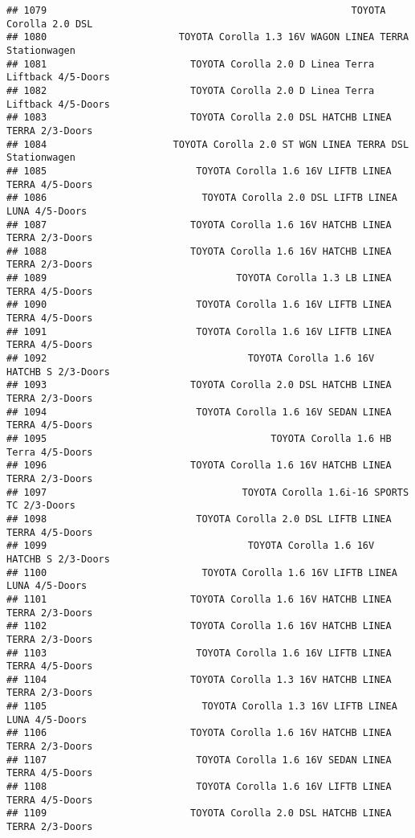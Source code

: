 \documentclass[]{article}
\begin{document}
\begin{verbatim}
## 1079                                                     TOYOTA Corolla 2.0 DSL 
## 1080                       TOYOTA Corolla 1.3 16V WAGON LINEA TERRA Stationwagen
## 1081                         TOYOTA Corolla 2.0 D Linea Terra Liftback 4/5-Doors
## 1082                         TOYOTA Corolla 2.0 D Linea Terra Liftback 4/5-Doors
## 1083                         TOYOTA Corolla 2.0 DSL HATCHB LINEA TERRA 2/3-Doors
## 1084                      TOYOTA Corolla 2.0 ST WGN LINEA TERRA DSL Stationwagen
## 1085                          TOYOTA Corolla 1.6 16V LIFTB LINEA TERRA 4/5-Doors
## 1086                           TOYOTA Corolla 2.0 DSL LIFTB LINEA LUNA 4/5-Doors
## 1087                         TOYOTA Corolla 1.6 16V HATCHB LINEA TERRA 2/3-Doors
## 1088                         TOYOTA Corolla 1.6 16V HATCHB LINEA TERRA 2/3-Doors
## 1089                                 TOYOTA Corolla 1.3 LB LINEA TERRA 4/5-Doors
## 1090                          TOYOTA Corolla 1.6 16V LIFTB LINEA TERRA 4/5-Doors
## 1091                          TOYOTA Corolla 1.6 16V LIFTB LINEA TERRA 4/5-Doors
## 1092                                   TOYOTA Corolla 1.6 16V HATCHB S 2/3-Doors
## 1093                         TOYOTA Corolla 2.0 DSL HATCHB LINEA TERRA 2/3-Doors
## 1094                          TOYOTA Corolla 1.6 16V SEDAN LINEA TERRA 4/5-Doors
## 1095                                       TOYOTA Corolla 1.6 HB Terra 4/5-Doors
## 1096                         TOYOTA Corolla 1.6 16V HATCHB LINEA TERRA 2/3-Doors
## 1097                                  TOYOTA Corolla 1.6i-16 SPORTS TC 2/3-Doors
## 1098                          TOYOTA Corolla 2.0 DSL LIFTB LINEA TERRA 4/5-Doors
## 1099                                   TOYOTA Corolla 1.6 16V HATCHB S 2/3-Doors
## 1100                           TOYOTA Corolla 1.6 16V LIFTB LINEA LUNA 4/5-Doors
## 1101                         TOYOTA Corolla 1.6 16V HATCHB LINEA TERRA 2/3-Doors
## 1102                         TOYOTA Corolla 1.6 16V HATCHB LINEA TERRA 2/3-Doors
## 1103                          TOYOTA Corolla 1.6 16V LIFTB LINEA TERRA 4/5-Doors
## 1104                         TOYOTA Corolla 1.3 16V HATCHB LINEA TERRA 2/3-Doors
## 1105                           TOYOTA Corolla 1.3 16V LIFTB LINEA LUNA 4/5-Doors
## 1106                         TOYOTA Corolla 1.6 16V HATCHB LINEA TERRA 2/3-Doors
## 1107                          TOYOTA Corolla 1.6 16V SEDAN LINEA TERRA 4/5-Doors
## 1108                          TOYOTA Corolla 1.6 16V LIFTB LINEA TERRA 4/5-Doors
## 1109                         TOYOTA Corolla 2.0 DSL HATCHB LINEA TERRA 2/3-Doors

\end{verbatim}
\end{document}
